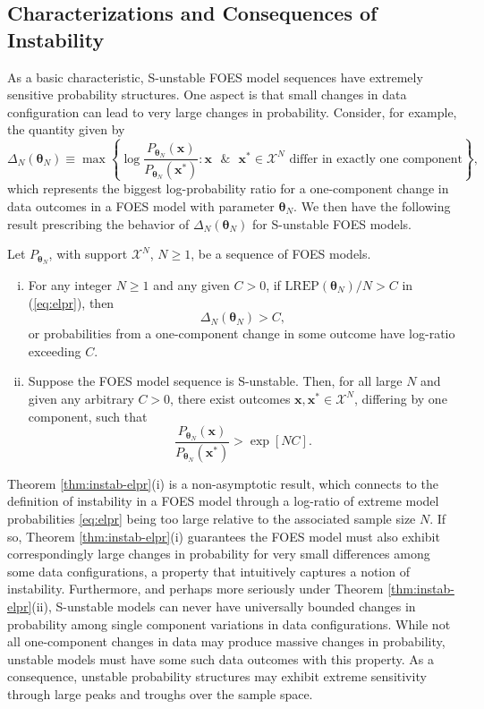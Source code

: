 \documentclass[numbib]{imamat}
\theoremstyle{theorem}
\theoremstyle{lemma}
\theoremstyle{example}
\theoremstyle{corollary}
\theoremstyle{definition}
\theoremstyle{remark}
\theoremstyle{approximation}
\theoremstyle{scheme}
\newcommand{\REP}{\mathrm{LREP}}
\newcommand{\DN}{\Delta_N}
\let\BeginKnitrBlock\begin \let\EndKnitrBlock\end
\begin{document}
\hypertarget{characterizations-and-consequences-of-instability}{%
\subsection{Characterizations and Consequences of
Instability}\label{characterizations-and-consequences-of-instability}}

As a basic characteristic, S-unstable FOES model sequences have
extremely sensitive probability structures. One aspect is that small
changes in data configuration can lead to very large changes in
probability. Consider, for example, the quantity given by \[
\DN(\boldsymbol \theta_N) \equiv \max \left\{\log \frac{P_{\boldsymbol \theta_N}(\boldsymbol x)}{P_{\boldsymbol \theta_N}(\boldsymbol x^*)} : \boldsymbol x \text{ }\& \text{ } \boldsymbol x^* \in \mathcal{X}^N \text{ differ in exactly one component}\right\},
\] which represents the biggest log-probability ratio for a
one-component change in data outcomes in a FOES model with parameter
\(\boldsymbol \theta_N\). We then have the following result prescribing
the behavior of \(\DN(\boldsymbol \theta_N)\) for S-unstable FOES
models.

\BeginKnitrBlock{theorem}
\protect\hypertarget{thm:instab-elpr}{}{\label{thm:instab-elpr} }Let
\(P_{\boldsymbol \theta_N}\), with support \(\mathcal{X}^N\),
\(N\geq 1\), be a sequence of FOES models.
\begin{enumerate}[(i)]
\item For any integer $N \geq 1$ and any given $C>0$, if $\REP(\boldsymbol \theta_N)/N > C$ in (\ref{eq:elpr}), then
    $$ \DN(\boldsymbol \theta_N) > C,$$
    or probabilities from a one-component change in some outcome have log-ratio exceeding $C$.
\item Suppose the FOES model sequence is S-unstable. Then, for all large $N$ and given any arbitrary $C>0$, there exist outcomes $\boldsymbol x,\boldsymbol x^*\in\mathcal{X}^N$, differing by one component, such that
    $$
    \frac{P_{\boldsymbol \theta_N}(\boldsymbol x)}{P_{\boldsymbol \theta_N}(\boldsymbol x^*)} > \exp[N C].
    $$
\end{enumerate}
\EndKnitrBlock{theorem}

Theorem \ref{thm:instab-elpr}(i) is a non-asymptotic result, which
connects to the definition of instability in a FOES model through a
log-ratio of extreme model probabilities \eqref{eq:elpr} being too large
relative to the associated sample size \(N\). If so, Theorem
\ref{thm:instab-elpr}(i) guarantees the FOES model must also exhibit
correspondingly large changes in probability for very small differences
among some data configurations, a property that intuitively captures a
notion of instability. Furthermore, and perhaps more seriously under
Theorem \ref{thm:instab-elpr}(ii), S-unstable models can never have
universally bounded changes in probability among single component
variations in data configurations. While not all one-component changes
in data may produce massive changes in probability, unstable models must
have some such data outcomes with this property. As a consequence,
unstable probability structures may exhibit extreme sensitivity through
large peaks and troughs over the sample space.
\end{document}
